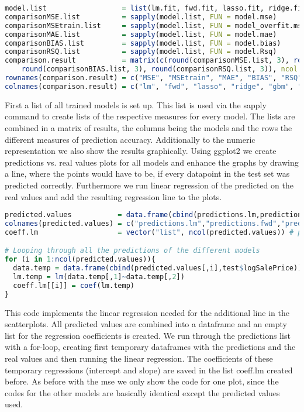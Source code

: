 \begin{lstlisting}[language=R]
model.list                  = list(lm.fit, fwd.fit, lasso.fit, ridge.fit, gbmtuned, rftuned)
comparisonMSE.list          = sapply(model.list, FUN = model.mse)
comparisonMSEtrain.list     = sapply(model.list, FUN = model_overfit.mse)
comparisonMAE.list          = sapply(model.list, FUN = model.mae)
comparisonBIAS.list         = sapply(model.list, FUN = model.bias)
comparisonRSQ.list          = sapply(model.list, FUN = model.Rsq)
comparison.result           = matrix(c(round(comparisonMSE.list, 3), round(comparisonMSEtrain.list, 3), round(comparisonMAE.list, 3), 
    round(comparisonBIAS.list, 3), round(comparisonRSQ.list, 3)), ncol = length(model.list), byrow = TRUE)
rownames(comparison.result) = c("MSE", "MSEtrain", "MAE", "BIAS", "RSQ")
colnames(comparison.result) = c("lm", "fwd", "lasso", "ridge", "gbm", "rf")
\end{lstlisting}
First a list of all trained models is set up. This list is used via the sapply command to create lists of the respective measures for every model. The lists are combined in a matrix of results, the columns being the models and the rows the different measures of prediction accuracy. Additionally to the numeric representation we also show the results graphically. Using ggplot2 we create predictions vs. real values plots for all models and enhance the graphs by drawing a line, where the points would have to be, if every datapoint in the test set was predicted correctly. Furthermore we run linear regression of the predicted on the real values and add the resulting regression line to the plots. 
\begin{lstlisting}[language=R]
predicted.values           = data.frame(cbind(predictions.lm,predictions.fwd,predictions.lasso,predictions.ridge,predictions.rf,predictions.gbm))
colnames(predicted.values) = c("predictions.lm","predictions.fwd","predictions.lasso","predictions.ridge","predictions.rf","predictions.gbm")
coeff.lm                   = vector("list", ncol(predicted.values)) # preparing an empty list for coefficients of regression

# Looping through all the predictions of the different models
for (i in 1:ncol(predicted.values)){
  data.temp = data.frame(cbind(predicted.values[,i],test$logSalePrice))
  lm.temp = lm(data.temp[,1]~data.temp[,2])
  coeff.lm[[i]] = coef(lm.temp)
}
\end{lstlisting}
This code implements the linear regression needed for the additional line in the scatterplots. All predicted values are combined into a dataframe and an empty list for the regression coefficients is created. We run through the predictions list with a for-loop, creating first temporary dataframes with the predictions and the real values and then running the linear regression. The coefficients of these temporary regressions (intercept and slope) are saved in the list coeff.lm created before. As before with the mse we only show the code for one plot, since  the codes for the other models are basically identical except the predicted values used.
